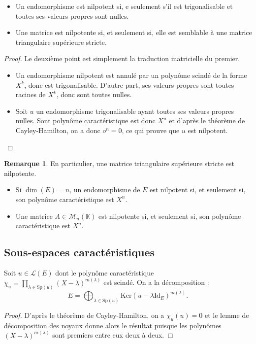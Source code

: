 \documentclass[french]{article}
\newcommand{\K}{\mathbb{K}}
\renewcommand{\ker}{\text{Ker}}
\newcommand{\Id}{\text{Id}}
\newcommand{\Sp}{\text{Sp}}
\theoremstyle{plain}
\theoremstyle{definition}
\newtheorem*{rmq}{Remarque}
\theoremstyle{remark}
\begin{document}
	\begin{prop}{}%
		\begin{itemize}
			\item Un endomorphisme est nilpotent si, e seulement s'il est trigonalisable et toutes ses valeurs propres sont nulles.
			\item Une matrice est nilpotente si, et seulement si, elle est semblable à une matrice triangulaire supérieure stricte.
		\end{itemize}
	\end{prop}
	\begin{proof}
		Le deuxième point est simplement la traduction matricielle du premier.
		\begin{itemize}
			\item Un endomorphisme nilpotent est annulé par un polynôme scindé de la forme $X^k$, donc est trigonalisable. D'autre part, ses valeurs propres sont toutes racines de $X^k$, donc sont toutes nulles.
			\item Soit $u$ un endomorphisme trigonalisable ayant toutes ses valeurs propres nulles. Sont polynôme caractéristique est donc $X^n$ et d'après le théorème de Cayley-Hamilton, on a donc $o^n=0$, ce qui prouve que $u$ est nilpotent.
		\end{itemize}
	\end{proof}
	
	\begin{rmq}
		En particulier, une matrice triangulaire supérieure stricte est nilpotente.
	\end{rmq}
	
	\begin{cor}{}%
		\begin{itemize}
			\item Si $\dim(E)=n$, un endomorphisme de $E$ est nilpotent si, et seulement si, son polynôme caractéristique est $X^n$.
			\item Une matrice $A\in\mathcal{M}_n(\K)$ est nilpotente si, et seulement si, son polynôme caractéristique est $X^n$.
		\end{itemize}
	\end{cor}
	
	\subsection{Sous-espaces caractéristiques}
	
	\begin{prop}
		Soit $u\in\mathcal{L}(E)$ dont le polynôme caractéristique $\chi_u=\displaystyle\prod_{\lambda\in\Sp(u)}(X-\lambda)^{m(\lambda)}$ est scindé. On a la décomposition : $$E=\bigoplus_{\lambda\in\Sp(u)}\ker(u-\lambda\Id_E)^{m(\lambda)}.$$
	\end{prop}
	\begin{proof}
		D'après le théorème de Cayley-Hamilton, on a $\chi_u(u)=0$ et le lemme de décomposition des noyaux donne alors le résultat puisque les polynômes $(X-\lambda)^{m(\lambda)}$ sont premiers entre eux deux à deux.
	\end{proof}
	
\end{document}
